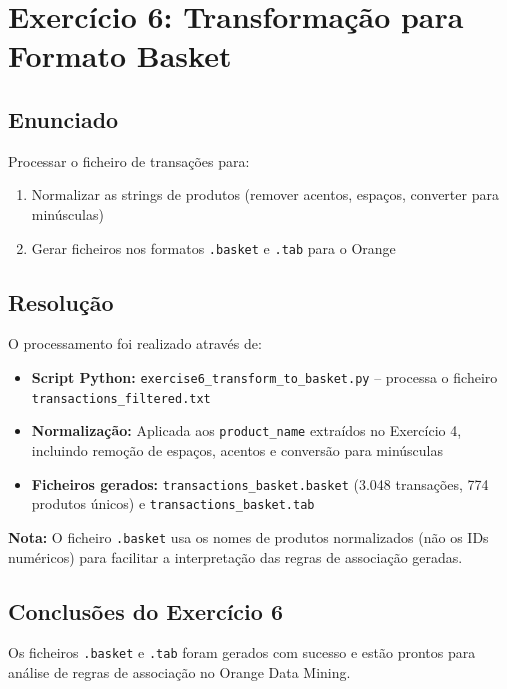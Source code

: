 \documentclass[11pt,a4paper]{article}
\begin{document}
\newpage

\section{Exercício 6: Transformação para Formato Basket}

\subsection{Enunciado}

Processar o ficheiro de transações para:
\begin{enumerate}
    \item Normalizar as strings de produtos (remover acentos, espaços, converter para minúsculas)
    \item Gerar ficheiros nos formatos \texttt{.basket} e \texttt{.tab} para o Orange
\end{enumerate}

\subsection{Resolução}

O processamento foi realizado através de:
\begin{itemize}
    \item \textbf{Script Python:} \texttt{exercise6\_transform\_to\_basket.py} -- processa o ficheiro \texttt{transactions\_filtered.txt}
    \item \textbf{Normalização:} Aplicada aos \texttt{product\_name} extraídos no Exercício 4, incluindo remoção de espaços, acentos e conversão para minúsculas
    \item \textbf{Ficheiros gerados:} \texttt{transactions\_basket.basket} (3.048 transações, 774 produtos únicos) e \texttt{transactions\_basket.tab}
\end{itemize}

\textbf{Nota:} O ficheiro \texttt{.basket} usa os nomes de produtos normalizados (não os IDs numéricos) para facilitar a interpretação das regras de associação geradas.

\subsection{Conclusões do Exercício 6}

Os ficheiros \texttt{.basket} e \texttt{.tab} foram gerados com sucesso e estão prontos para análise de regras de associação no Orange Data Mining.
\end{document}
